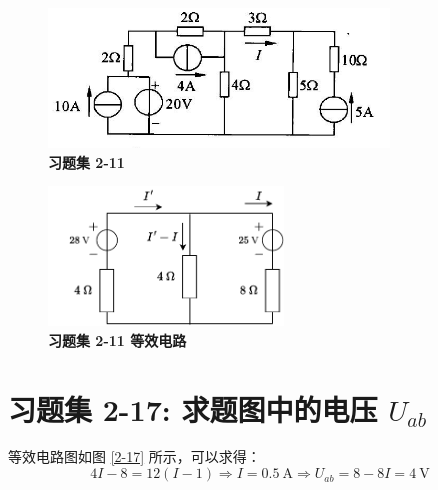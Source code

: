 \documentclass[UTF8]{report}
\theoremstyle{MyLineTheoremStyle} %
\theoremstyle{MyBlockTheoremStyle} %
\theoremstyle{MySubsubsectionStyle} %
\begin{document}
\noindent\begin{minipage}{0.55\textwidth}
\begin{figure}[H]\centering
\includegraphics[height=105pt]{assets/2/1187c3e12fa1e6bd8d2019d53bd2752a.jpg}
\caption{\textbf{习题集 2-11}}
\end{figure}
\end{minipage}\hfill
\begin{minipage}{0.43\textwidth}
\begin{figure}[H]\centering
\includegraphics[height=105pt]{assets/2/2-11.drawio.pdf}
\caption{\textbf{习题集 2-11 等效电路}}\label{习题集 2-11 等效电路}
\end{figure}
\end{minipage}

\section{习题集 2-17: 求题图中的电压 $U_{ab}$}

等效电路图如图 \ref{2-17} 所示，可以求得：
\begin{equation*}
4I - 8 = 12(I-1) \Longrightarrow I = 0.5\ \mathrm{A}\Longrightarrow U_{ab} = 8 - 8I = 4\ \mathrm{V}
\end{equation*}
\end{document}
